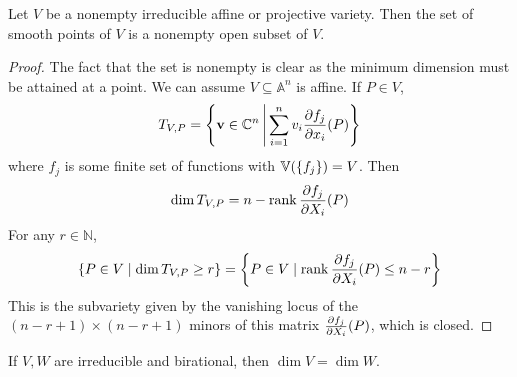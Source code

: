 \begin{theorem}
    Let \( V \) be a nonempty irreducible affine or projective variety.
    Then the set of smooth points of \( V \) is a nonempty open subset of \( V \).
\end{theorem}
\begin{proof}
    The fact that the set is nonempty is clear as the minimum dimension must be attained at a point.
    We can assume \( V \subseteq \mathbb A^n \) is affine.
    If \( P \in V \),
    \[ T_{V,P} = \qty{\vb v \in \mathbb C^n \,\middle|\,\sum_{i=1}^n v_i \pdv{f_j}{x_i}\qty(P)} \]
    where \( f_j \) is some finite set of functions with \( \mathbb V(\qty{f_j}) = V \).
    Then
    \[ \dim T_{V,P} = n - \rank \pdv{f_j}{X_i}\qty(P) \]
    For any \( r \in \mathbb N \),
    \[ \qty{P \in V \mid \dim T_{V,P} \geq r} = \qty{P \in V \mid \rank \pdv{f_j}{X_i}\qty(P) \leq n - r} \]
    This is the subvariety given by the vanishing locus of the \( (n-r+1) \times (n-r+1) \) minors of this matrix \( \pdv{f_j}{X_i}\qty(P) \), which is closed.
\end{proof}
\begin{corollary}
    If \( V, W \) are irreducible and birational, then \( \dim V = \dim W \).
\end{corollary}
